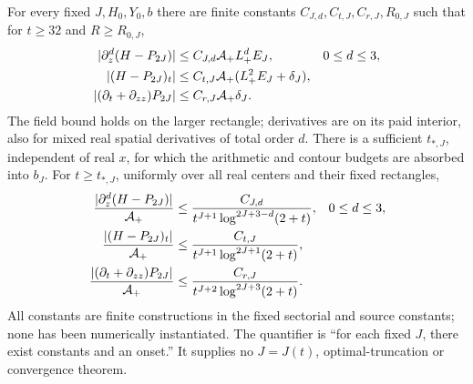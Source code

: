 \begin{theorem}
\label{thm:positive-fixed}
For every fixed $J,H_0,Y_0,b$ there are finite constants
$C_{J,d},C_{t,J},C_{r,J},R_{0,J}$ such that for $t\ge32$ and
$R\ge R_{0,J}$,
\begin{align}
 |\partial_z^d(H-P_{2J})|&\le C_{J,d}\mathcal A_+L_+^dE_J,
                         &&0\le d\le3,\notag\\
 |(H-P_{2J})_t|&\le C_{t,J}\mathcal A_+(L_+^2E_J+\delta_J),\notag\\
 |(\partial_t+\partial_{zz})P_{2J}|&\le C_{r,J}\mathcal A_+\delta_J.
 \label{eq:positive-joint-error}
\end{align}
The field bound holds on the larger rectangle; derivatives are on
its paid interior, also for mixed real spatial derivatives of total
order $d$. There is a sufficient $t_{*,J}$, independent of real $x$,
for which the arithmetic and contour budgets are absorbed into $b_J$.
For $t\ge t_{*,J}$, uniformly over all real centers and their fixed
rectangles,
\begin{align}
 \frac{|\partial_z^d(H-P_{2J})|}{\mathcal A_+}
 &\le\frac{C_{J,d}}{t^{J+1}\log^{2J+3-d}(2+t)},&&0\le d\le3,\notag\\
 \frac{|(H-P_{2J})_t|}{\mathcal A_+}
 &\le\frac{C_{t,J}}{t^{J+1}\log^{2J+1}(2+t)},\notag\\
 \frac{|(\partial_t+\partial_{zz})P_{2J}|}{\mathcal A_+}
 &\le\frac{C_{r,J}}{t^{J+2}\log^{2J+3}(2+t)}.
 \label{eq:positive-eventual-error}
\end{align}
All constants are finite constructions in the fixed sectorial and
source constants; none has been numerically instantiated. The
quantifier is ``for each fixed $J$, there exist constants and an
onset.'' It supplies no $J=J(t)$, optimal-truncation or convergence
theorem.
\end{theorem}

